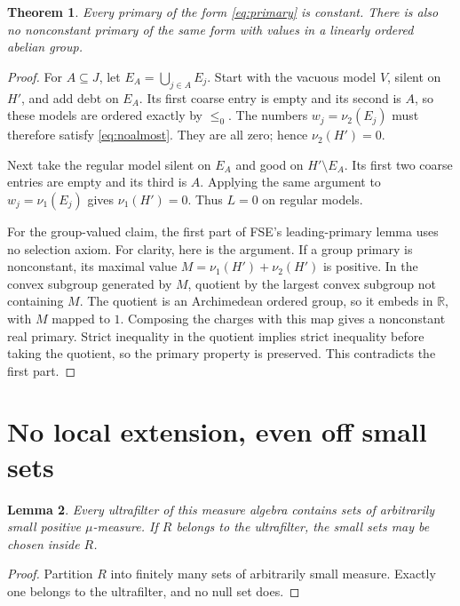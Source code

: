 \documentclass[11pt]{article}
\newtheorem{theorem}{Theorem}
\newtheorem{lemma}[theorem]{Lemma}
\theoremstyle{remark}\newtheorem{remark}[theorem]{Remark}
\begin{document}
\begin{theorem}\label{thm:noprimary}
Every primary of the form \eqref{eq:primary} is constant. There is also
no nonconstant primary of the same form with values in a linearly
ordered abelian group.
\end{theorem}
\begin{proof}
For $A\subseteq J$, let $E_A=\bigcup_{j\in A}E_j$. Start with the vacuous
model $V$, silent on $H'$, and add debt on $E_A$. Its first coarse entry
is empty and its second is $A$, so these models are ordered exactly by
$\le_0$. The numbers $w_j=\nu_2(E_j)$ must therefore satisfy
\eqref{eq:noalmost}. They are all zero; hence $\nu_2(H')=0$.

Next take the regular model silent on $E_A$ and good on $H'\setminus E_A$.
Its first two coarse entries are empty and its third is $A$. Applying
the same argument to $w_j=\nu_1(E_j)$ gives $\nu_1(H')=0$. Thus $L=0$
on regular models.

For the group-valued claim, the first part of FSE's leading-primary
lemma uses no selection axiom. For clarity, here is the argument.
If a group primary is nonconstant, its maximal value
$M=\nu_1(H')+\nu_2(H')$ is positive. In the convex subgroup generated
by $M$, quotient by the largest convex subgroup not containing $M$.
The quotient is an Archimedean ordered group, so it embeds in
$\mathbb R$, with $M$ mapped to $1$. Composing the charges with this
map gives a nonconstant real primary. Strict inequality in the
quotient implies strict inequality before taking the quotient, so
the primary property is preserved. This contradicts the first part.
\end{proof}

\section{No local extension, even off small sets}

\begin{lemma}\label{lem:small}
Every ultrafilter of this measure algebra contains sets of arbitrarily
small positive $\mu$-measure. If $R$ belongs to the ultrafilter, the
small sets may be chosen inside $R$.
\end{lemma}
\begin{proof}
Partition $R$ into finitely many sets of arbitrarily small measure.
Exactly one belongs to the ultrafilter, and no null set does.
\end{proof}
\end{document}
